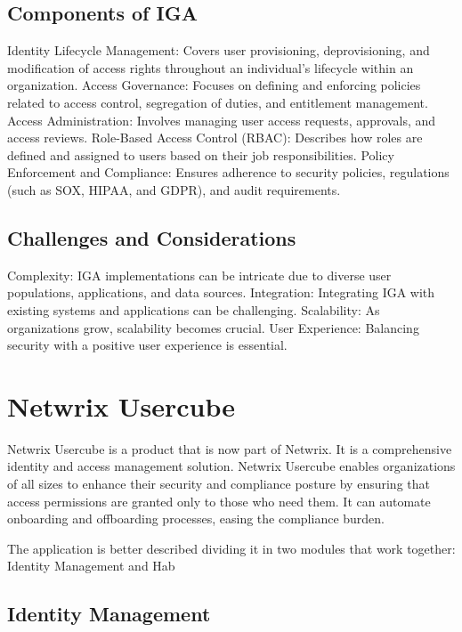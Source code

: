 \subsection{Components of IGA}
\label{sec:Template}

Identity Lifecycle Management: Covers user provisioning, deprovisioning, and modification of access rights throughout an individual’s lifecycle within an organization. Access Governance: Focuses on defining and enforcing policies related to access control, segregation of duties, and entitlement management. Access Administration: Involves managing user access requests, approvals, and access reviews. Role-Based Access Control (RBAC): Describes how roles are defined and assigned to users based on their job responsibilities. Policy Enforcement and Compliance: Ensures adherence to security policies, regulations (such as SOX, HIPAA, and GDPR), and audit requirements.

\subsection{Challenges and Considerations}
\label{sec:Template}

Complexity: IGA implementations can be intricate due to diverse user populations, applications, and data sources. Integration: Integrating IGA with existing systems and applications can be challenging. Scalability: As organizations grow, scalability becomes crucial. User Experience: Balancing security with a positive user experience is essential.

\section{Netwrix Usercube}
\label{sec:Template}

Netwrix Usercube is a product that is now part of Netwrix. It is a comprehensive identity and access management solution. Netwrix Usercube enables organizations of all sizes to enhance their security and compliance posture by ensuring that access permissions are granted only to those who need them. It can automate onboarding and offboarding processes, easing the compliance burden.

The application is better described dividing it in two modules that work together: Identity Management and Hab

\subsection{Identity Management}
\label{sec:Template}

